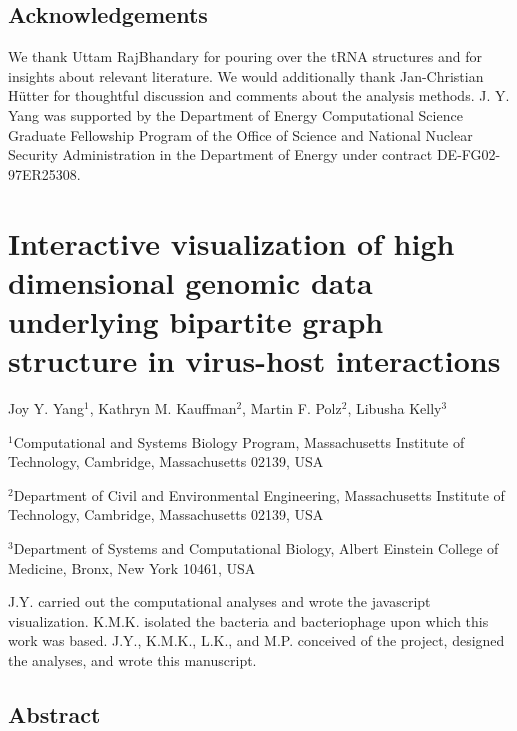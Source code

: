 \documentclass[12pt,twoside]{mitthesis-manusdown}
\begin{document}
\section{Acknowledgements}\label{acknowledgements-1}

We thank Uttam RajBhandary for pouring over the tRNA structures and for
insights about relevant literature. We would additionally thank
Jan-Christian Hütter for thoughtful discussion and comments about the
analysis methods. J. Y. Yang was supported by the Department of Energy
Computational Science Graduate Fellowship Program of the Office of
Science and National Nuclear Security Administration in the Department
of Energy under contract DE-FG02-97ER25308.

\chapter{Interactive visualization of high dimensional genomic data
underlying bipartite graph structure in virus-host
interactions}\label{interactive-visualization-of-high-dimensional-genomic-data-underlying-bipartite-graph-structure-in-virus-host-interactions}

\singlespace
Joy Y. Yang\(^1\), Kathryn M. Kauffman\(^2\), Martin F. Polz\(^2\),
Libusha Kelly\(^3\) \newline 

\noindent \(^1\)Computational and Systems Biology Program, Massachusetts
Institute of Technology, Cambridge, Massachusetts 02139, USA

\noindent \(^2\)Department of Civil and Environmental Engineering,
Massachusetts Institute of Technology, Cambridge, Massachusetts 02139,
USA

\noindent \(^3\)Department of Systems and Computational Biology, Albert
Einstein College of Medicine, Bronx, New York 10461, USA \newline

\noindent J.Y. carried out the computational analyses and wrote the
javascript visualization. K.M.K. isolated the bacteria and bacteriophage
upon which this work was based. J.Y., K.M.K., L.K., and M.P. conceived
of the project, designed the analyses, and wrote this manuscript.

\doublespace
\newpage

\section{Abstract}\label{abstract-1}
\end{document}
